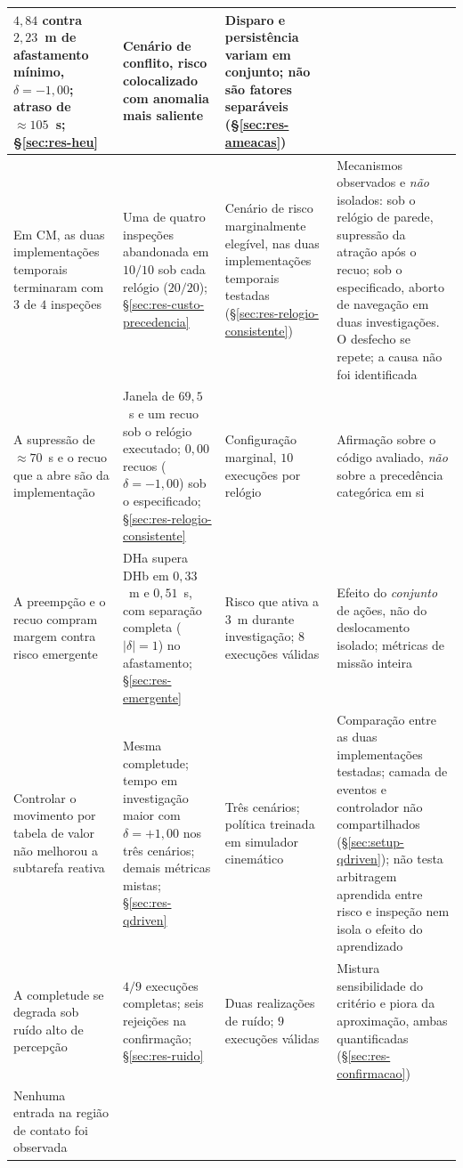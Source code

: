 \begin{table}[htb]
\begin{tabular}{p{}p{}p{}p{}}
$4{,}84$ contra $2{,}23$~m de afastamento mínimo, $\delta=-1{,}00$; atraso de
$\approx 105$~s; §\ref{sec:res-heu} &
Cenário de conflito, risco colocalizado com anomalia mais saliente &
Disparo e persistência variam em conjunto; não são fatores separáveis
(§\ref{sec:res-ameacas})\\
\hline
Em CM, as duas implementações temporais terminaram com $3$ de $4$ inspeções &
Uma de quatro inspeções abandonada em $10/10$ sob cada relógio ($20/20$);
§\ref{sec:res-custo-precedencia} &
Cenário de risco marginalmente elegível, nas duas implementações temporais testadas
(§\ref{sec:res-relogio-consistente}) &
Mecanismos observados e \emph{não} isolados: sob o relógio de parede, supressão da
atração após o recuo; sob o especificado, aborto de navegação em duas investigações. O
desfecho se repete; a causa não foi identificada\\
\hline
A supressão de $\approx 70$~s e o recuo que a abre são da implementação &
Janela de $69{,}5$~s e um recuo sob o relógio executado; $0{,}00$ recuos
($\delta=-1{,}00$) sob o especificado; §\ref{sec:res-relogio-consistente} &
Configuração marginal, $10$ execuções por relógio &
Afirmação sobre o código avaliado, \emph{não} sobre a precedência categórica em si\\
\hline
A preempção e o recuo compram margem contra risco emergente &
DHa supera DHb em $0{,}33$~m e $0{,}51$~s, com separação completa ($|\delta|=1$) no
afastamento; §\ref{sec:res-emergente} &
Risco que ativa a $3$~m durante investigação; $8$ execuções válidas &
Efeito do \emph{conjunto} de ações, não do deslocamento isolado; métricas de missão
inteira\\
\hline
Controlar o movimento por tabela de valor não melhorou a subtarefa reativa &
Mesma completude; tempo em investigação maior com $\delta=+1{,}00$ nos três cenários;
demais métricas mistas; §\ref{sec:res-qdriven} &
Três cenários; política treinada em simulador cinemático &
Comparação entre as duas implementações testadas; camada de eventos e controlador não
compartilhados (§\ref{sec:setup-qdriven}); não testa arbitragem aprendida entre risco
e inspeção nem isola o efeito do aprendizado\\
\hline
A completude se degrada sob ruído alto de percepção &
$4/9$ execuções completas; seis rejeições na confirmação;
§\ref{sec:res-ruido} &
Duas realizações de ruído; $9$ execuções válidas &
Mistura sensibilidade do critério e piora da aproximação, ambas quantificadas
(§\ref{sec:res-confirmacao})\\
\hline
Nenhuma entrada na região de contato foi observada &

\end{tabular}
\end{table}

